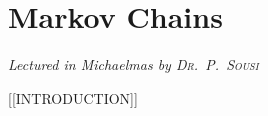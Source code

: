 \chapter[Markov Chains \\ \textnormal{\emph{Lectured in Michaelmas \oldstylenums{2021} by \textsc{Dr.\ P.\ Sousi}}}]{Markov Chains}
\emph{\Large Lectured in Michaelmas  by \textsc{Dr.\ P.\ Sousi}}

[[INTRODUCTION]]


